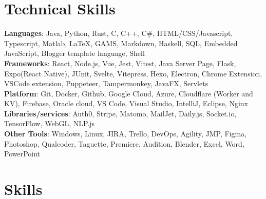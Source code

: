 


\section{Technical Skills}
\begin{itemize}[leftmargin=0.15in, label={}]
    \small{\item{
          \textbf{Languages}{: Java, Python, Rust, C, C++, C\#, HTML/CSS/Javascript, Typescript, Matlab, \LaTeX, GAMS, Markdown, Haskell, SQL, Embedded JavaScript, Blogger template language, Shell} \\
          \textbf{Frameworks}{: React, Node.js, Vue, Jest, Vitest, Java Server Page, Flask, Expo(React Native), JUnit, Svelte, Vitepress, Hexo, Electron, Chrome Extension, VSCode extension, Puppeteer, Tampermonkey, JavaFX, Servlets} \\
          \textbf{Platform}{: Git, Docker, Github, Google Cloud, Azure, Cloudflare (Worker and KV), Firebase, Oracle cloud, VS Code, Visual Studio, IntelliJ, Eclipse, Nginx} \\
          \textbf{Libraries/services}{: Auth0, Stripe, Matomo, MailJet, Daily.js, Socket.io, TensorFlow, WebGL, NLP.js}\\
          \textbf{Other Tools}{: Windows, Linux, JIRA, Trello, DevOps, Agility, JMP, Figma, Photoshop, Qualcoder, Taguette, Premiere, Audition, Blender, Excel, Word, PowerPoint}
          }}
\end{itemize}





\section{Skills}


